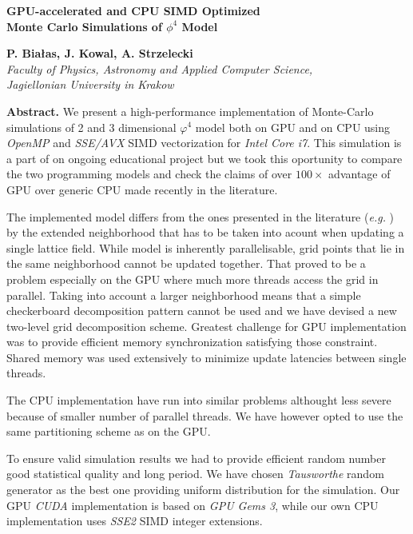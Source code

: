 \documentclass[11pt,a4paper]{article}
\begin{document}
\begin{samepage}
\begin{center}
{\Large{\bf GPU-accelerated and CPU SIMD Optimized \\ Monte Carlo Simulations of $\phi^4$ Model }}

\vspace {5mm}
{\bf P. Białas, J. Kowal, A. Strzelecki}\\
{\em Faculty of Physics, Astronomy and Applied Computer Science, \\ Jagiellonian University in Krakow }\\

\end{center}
\end{samepage}

{\bf Abstract.}  We present a high-performance implementation of
Monte-Carlo simulations of 2 and 3 dimensional $\varphi^4$ model
\cite{PhysRevE.64.066113} both on GPU and on CPU using \emph{OpenMP}
and \emph{SSE/AVX} SIMD vectorization for \emph{Intel Core i7}. This
simulation is a part of on ongoing educational project but we took this
oportunity to compare the two programming models and check the claims
of over $100\times$ advantage of GPU over generic CPU made recently in
the literature.

The implemented model differs from the ones presented in the
literature ({\em e.g.} \cite{Preis20094468}) by the extended
neighborhood that has to be taken into acount when updating a single
lattice field. While model is inherently parallelisable, grid points
that lie in the same neighborhood cannot be updated together. That
proved to be a problem especially on the GPU where much more threads
access the grid in parallel.  Taking into account a larger
neighborhood means that a simple checkerboard decomposition pattern
cannot be used and we have devised a new two-level grid decomposition
scheme.  Greatest challenge for GPU implementation was to provide
efficient memory synchronization satisfying those constraint.  Shared
memory was used extensively to minimize update latencies between
single threads.

The CPU implementation have run into similar problems althought less
severe because of smaller number of parallel threads. We have however opted to
use the same partitioning scheme as on the GPU.

To ensure valid simulation results we had to provide efficient random
number good statistical quality and long period. We have chosen
\emph{Tausworthe} random generator\cite{LEcuyer96} as the best one
providing uniform distribution for the simulation. Our GPU \emph{CUDA}
implementation is based on \emph{GPU Gems 3}\cite{howes_thomas07},
while our own CPU implementation uses \emph{SSE2} SIMD integer
extensions.
\end{document}
